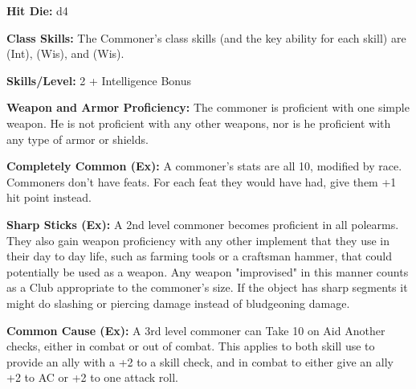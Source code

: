 
\textbf{Hit Die:} d4

\textbf{Class Skills:} The Commoner's class skills (and the key ability for each skill) are  (Int),  (Wis), and  (Wis).

\textbf{Skills/Level:} 2 + Intelligence Bonus

\poorbab
\poorfor
\poorref
\poorwil

\begin{classtable}
\end{classtable}

\classfeatures

\textbf{Weapon and Armor Proficiency:} The commoner is proficient with one simple weapon. He is not proficient with any other weapons, nor is he proficient with any type of armor or shields.

\textbf{Completely Common (Ex):} A commoner's stats are all 10, modified by race. Commoners don't have feats. For each feat they would have had, give them +1 hit point instead.

\textbf{Sharp Sticks (Ex):} A 2nd level commoner becomes proficient in all polearms. They also gain weapon proficiency with any other implement that they use in their day to day life, such as farming tools or a craftsman hammer, that could potentially be used as a weapon. Any weapon "improvised" in this manner counts as a Club appropriate to the commoner's size. If the object has sharp segments it might do slashing or piercing damage instead of bludgeoning damage.

\textbf{Common Cause (Ex):} A 3rd level commoner can Take 10 on Aid Another checks, either in combat or out of combat. This applies to both skill use to provide an ally with a +2 to a skill check, and in combat to either give an ally +2 to AC or +2 to one attack roll.